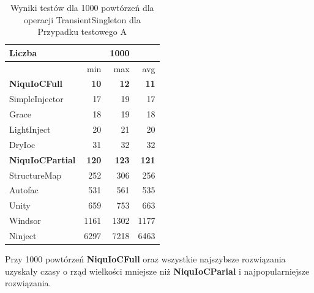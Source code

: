 \documentclass[12pt]{article}
\begin{document}
\begin{table}[H]
\captionsetup{belowskip=0pt,aboveskip=0pt}
\begin{center}
\begin{small}
	\begin{tabular}{ | l | r r r | }
    		\hline
Liczba & & 1000 & \\ \hline
 & min & max & avg \\ \hline
\textbf{NiquIoCFull} & \textbf{10} & \textbf{12} & \textbf{11} \\ \hline
SimpleInjector & 17 & 19 & 17 \\ \hline
Grace & 18 & 19 & 18 \\ \hline
LightInject & 20 & 21 & 20 \\ \hline
DryIoc & 31 & 32 & 32 \\ \hline
\textbf{NiquIoCPartial} & \textbf{120} & \textbf{123} & \textbf{121} \\ \hline
StructureMap & 252 & 306 & 256 \\ \hline
Autofac & 531 & 561 & 535 \\ \hline
Unity & 659 & 753 & 663 \\ \hline
Windsor & 1161 & 1302 & 1177 \\ \hline
Ninject & 6297 & 7218 & 6463 \\ \hline
  	\end{tabular}
\end{small}
\end{center}
\caption{Wyniki testów dla 1000 powtórzeń dla operacji TransientSingleton dla Przypadku testowego A}
\label{TestCaseA_TransientSingleton1000}
\end{table}
Przy 1000 powtórzeń \textbf{NiquIoCFull} oraz wszystkie najszybsze rozwiązania uzyskały czasy o rząd wielkości mniejsze niż \textbf{NiquIoCParial} i najpopularniejsze rozwiązania.
\end{document}
